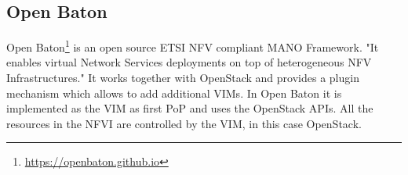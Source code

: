 

\subsection{Open Baton}
Open Baton\footnote{\url{https://openbaton.github.io}} is an open source \ac{ETSI} \ac{NFV} compliant \ac{MANO} Framework\autocite[cf.]{openBatonDoc}.
"It enables virtual Network Services deployments on top of heterogeneous \ac{NFV} Infrastructures."\autocite{openBatonDoc}
It works together with OpenStack and provides a plugin mechanism which allows to add additional \acp{VIM}.\autocite[cf.]{openBatonDoc}
In Open Baton it is implemented as the \ac{VIM} as first \ac{PoP} and uses the OpenStack \acp{API}.\autocite{openBatonDoc}
All the resources in the \ac{NFVI} are controlled by the \ac{VIM}, in this case OpenStack.

